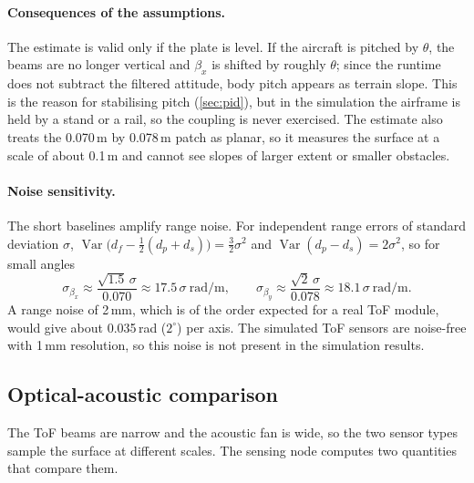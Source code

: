 \documentclass[11pt,a4paper]{article}
\begin{document}
\paragraph{Consequences of the assumptions.} The estimate is valid only if the plate is level. If the aircraft is pitched by $\theta$, the beams are no longer vertical and $\beta_x$ is shifted by roughly $\theta$; since the runtime does not subtract the filtered attitude, body pitch appears as terrain slope. This is the reason for stabilising pitch (\cref{sec:pid}), but in the simulation the airframe is held by a stand or a rail, so the coupling is never exercised. The estimate also treats the 0.070\,m by 0.078\,m patch as planar, so it measures the surface at a scale of about 0.1\,m and cannot see slopes of larger extent or smaller obstacles.
 
\paragraph{Noise sensitivity.} The short baselines amplify range noise. For independent range errors of standard deviation $\sigma$, $\operatorname{Var}\bigl(d_f-\tfrac12(d_p+d_s)\bigr)=\tfrac32\sigma^2$ and $\operatorname{Var}(d_p-d_s)=2\sigma^2$, so for small angles
\begin{equation}
\sigma_{\beta_x}\approx\frac{\sqrt{1.5}\,\sigma}{0.070}\approx17.5\,\sigma\ \mathrm{rad/m},\qquad
\sigma_{\beta_y}\approx\frac{\sqrt2\,\sigma}{0.078}\approx18.1\,\sigma\ \mathrm{rad/m}.
\end{equation}
A range noise of 2\,mm, which is of the order expected for a real ToF module, would give about 0.035\,rad ($2^\circ$) per axis. The simulated ToF sensors are noise-free with 1\,mm resolution, so this noise is not present in the simulation results.
 
\subsection{Optical-acoustic comparison}\label{sec:texture}
The ToF beams are narrow and the acoustic fan is wide, so the two sensor types sample the surface at different scales. The sensing node computes two quantities that compare them.
 
\end{document}
